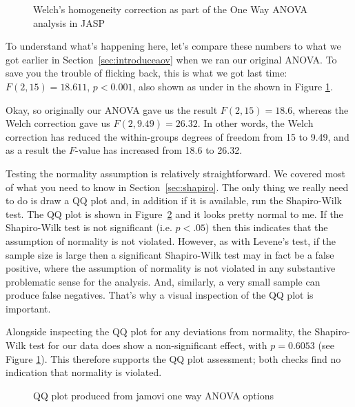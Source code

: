 \begin{figure}[htb]
\begin{center}
\caption{Welch's homogeneity correction as part of the One Way ANOVA analysis in JASP }
\HR
\label{fig:anova4a}
\end{center}
\end{figure}

\noindent
To understand what's happening here, let's compare these numbers to what we got earlier in Section~\ref{sec:introduceaov} when we ran our original ANOVA. To save you the trouble of flicking back, this is what we got last time: $F(2,15) = 18.611$, $p<0.001$, also shown as  under  in the  shown in Figure \ref{fig:anova4a}. 

Okay, so originally our ANOVA gave us the result $F(2,15) = 18.6$, whereas the Welch correction gave us $F(2,9.49) = 26.32$. In other words, the Welch correction has reduced the within-groups degrees of freedom from 15 to 9.49, and as a result the $F$-value has increased from 18.6 to 26.32. 


Testing the normality assumption is relatively straightforward. We covered most of what you need to know in Section~\ref{sec:shapiro}. The only thing we really need to do is draw a QQ plot and, in addition if it is available, run the Shapiro-Wilk test. The QQ plot is shown in Figure~\ref{fig:anova5} and it looks pretty normal to me. If the Shapiro-Wilk test is not significant (i.e. $p<.05$) then this indicates that the assumption of normality is not violated. However, as with Levene's test, if the sample size is large then a significant  Shapiro-Wilk test may in fact be a false positive, where the assumption of normality is not violated in any substantive problematic sense for the analysis. And, similarly, a very small sample can produce false negatives. That's why a visual inspection of the QQ plot is important. 

Alongside inspecting the QQ plot for any deviations from normality, the Shapiro-Wilk test for our data does show a non-significant effect, with $p=0.6053$ (see Figure \ref{fig:anova4a}). This therefore supports the QQ plot assessment; both checks find no indication that normality is violated.

\begin{figure}[p]
\begin{center}
\caption{QQ plot produced from jamovi one way ANOVA options}
\HR
\label{fig:anova5}
\end{center}
\end{figure}


